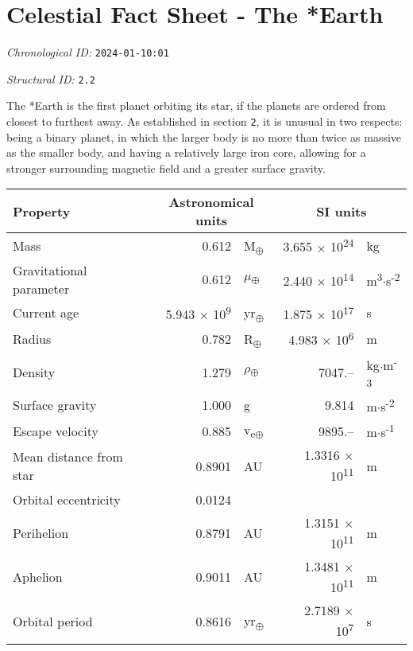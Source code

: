 \section{Celestial Fact Sheet - The *Earth}
\emph{Chronological ID:} \texttt{2024-01-10:01}

\emph{Structural ID:} \texttt{2.2}

The *Earth is the first planet orbiting its star, if the planets are ordered from closest to furthest away. As established in section \texttt{2}, it is unusual in two respects: being a binary planet, in which the larger body is no more than twice as massive as the smaller body, and having a relatively large iron core, allowing for a stronger surrounding magnetic field and a greater surface gravity.

\begin{tabular}{|p{4cm}|r l|r l|}
  \hline
  Property & \multicolumn{2}{c|}{Astronomical units} & \multicolumn{2}{c|}{SI units} \\
  \hline \hline
  Mass & 0.612 & M\textsubscript{$\oplus$} & 3.655 $\times$ 10\textsuperscript{24} & kg \\
  Gravitational parameter & 0.612 & $\mu$\textsubscript{$\oplus$} & 2.440 $\times$ 10\textsuperscript{14} & m\textsuperscript{3}$\cdot$s\textsuperscript{-2} \\
  Current age & 5.943 $\times$ 10\textsuperscript{9} & yr\textsubscript{$\oplus$} & 1.875 $\times$ 10\textsuperscript{17} & s \\
  Radius & 0.782 & R\textsubscript{$\oplus$} & 4.983 $\times$ 10\textsuperscript{6} & m \\
  Density & 1.279 & $\rho$\textsubscript{$\oplus$} & 7047.-- & kg$\cdot$m\textsuperscript{-3} \\
  Surface gravity & 1.000 & g & 9.814 & m$\cdot$s\textsuperscript{-2} \\
  Escape velocity & 0.885 & v\textsubscript{e$\oplus$} & 9895.-- & m$\cdot$s\textsuperscript{-1} \\
  Mean distance from star & 0.8901 & AU & 1.3316 $\times$ 10\textsuperscript{11} & m \\
  Orbital eccentricity & 0.0124 & & & \\
  Perihelion & 0.8791 & AU & 1.3151 $\times$ 10\textsuperscript{11} & m \\
  Aphelion & 0.9011 & AU & 1.3481 $\times$ 10\textsuperscript{11} & m \\
  Orbital period & 0.8616 & yr\textsubscript{$\oplus$} & 2.7189 $\times$ 10\textsuperscript{7} & s \\

\end{tabular}
